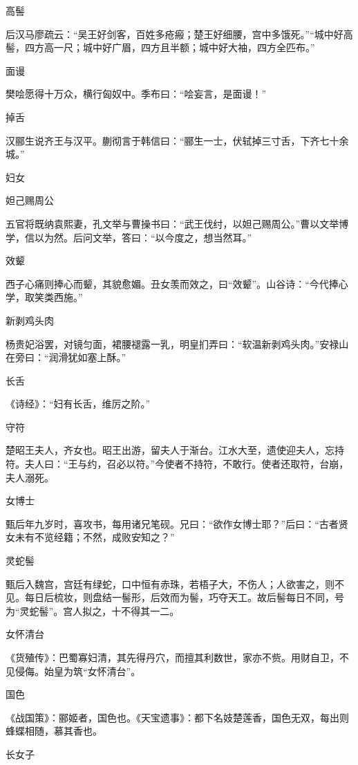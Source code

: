 \documentclass[a4paper,12pt,UTF8,twoside]{ctexbook}
\begin{document}
    高髻
    
    后汉马廖疏云：“吴王好剑客，百姓多疮瘢；楚王好细腰，宫中多饿死。”“城中好高髻，四方高一尺；城中好广眉，四方且半额；城中好大袖，四方全匹布。”
    
    面谩
    
    樊哙愿得十万众，横行匈奴中。季布曰：“哙妄言，是面谩！”
    
    掉舌
    
    汉郦生说齐王与汉平。蒯彻言于韩信曰：“郦生一士，伏轼掉三寸舌，下齐七十余城。”
    
    妇女
    
    妲己赐周公
    
    五官将既纳袁熙妻，孔文举与曹操书曰：“武王伐纣，以妲己赐周公。”曹以文举博学，信以为然。后问文举，答曰：“以今度之，想当然耳。”
    
    效颦
    
    西子心痛则捧心而颦，其貌愈媚。丑女羡而效之，曰“效颦”。山谷诗：“今代捧心学，取笑类西施。”
    
    新剥鸡头肉
    
    杨贵妃浴罢，对镜匀面，裙腰褪露一乳，明皇扪弄曰：“软温新剥鸡头肉。”安禄山在旁曰：“润滑犹如塞上酥。”
    
    长舌
    
    《诗经》：“妇有长舌，维厉之阶。”
    
    守符
    
    楚昭王夫人，齐女也。昭王出游，留夫人于渐台。江水大至，遗使迎夫人，忘持符。夫人曰：“王与约，召必以符。”今使者不持符，不敢行。使者还取符，台崩，夫人溺死。
    
    女博士
    
    甄后年九岁时，喜攻书，每用诸兄笔砚。兄曰：“欲作女博士耶？”后曰：“古者贤女未有不览经籍；不然，成败安知之？”
    
    灵蛇髻
    
    甄后入魏宫，宫廷有绿蛇，口中恒有赤珠，若梧子大，不伤人；人欲害之，则不见。每日后梳妆，则盘结一髻形，后效而为髻，巧夺天工。故后髻每日不同，号为“灵蛇髻”。宫人拟之，十不得其一二。
    
    女怀清台
    
    《货殖传》：巴蜀寡妇清，其先得丹穴，而擅其利数世，家亦不赀。用财自卫，不见侵侮。始皇为筑“女怀清台”。
    
    国色
    
    《战国策》：郦姬者，国色也。《天宝遗事》：都下名妓楚莲香，国色无双，每出则蜂蝶相随，慕其香也。
    
    长女子
    
\end{document}
